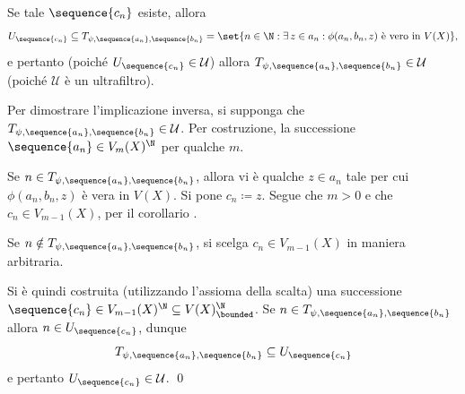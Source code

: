 {\begin{itemize}
        Se tale $ \sequence{c_{n} } $ esiste, allora \begin{equation*}
            U_{\sequence{c_{n} }} \subseteq T_{\psi, \sequence{a_{n}},\sequence{b_{n}}} = \set{n \in \N: \exists\, z \in a_{n}: \phi(a_{n}, b_{n}, z  ) \text{ è vero in }V(X)},   
        \end{equation*}e pertanto (poiché $ U_{\sequence{c_{n} }} \in \mathcal{U} $) allora $ T_{\psi, \sequence{a_{n}},\sequence{b_{n}}} \in \mathcal{U} $ (poiché $ \mathcal{U} $ è un ultrafiltro). 

        Per dimostrare l'implicazione inversa, si supponga che $ T_{\psi, \sequence{a_{n}},\sequence{b_{n}}} \in \mathcal{U} $. Per costruzione, la successione $ \sequence{a_{n} } \in V_{m}(X)^{\N}  $ per qualche $ m $. 
        
        Se $ n \in T_{\psi, \sequence{a_{n}},\sequence{b_{n}}} $, allora vi è qualche $ z \in a_{n}  $ tale per cui $ \phi(a_{n}, b_{n}, z) $ è vera in $ V(X) $. Si pone $ c_{n} \coloneqq z  $. Segue che $ m>0 $ e che $ c_{n} \in V_{m-1}(X)  $, per il corollario . 

        Se $ n \notin T_{\psi, \sequence{a_{n}},\sequence{b_{n}}}$, si scelga $ c_{n} \in V_{m-1}(X) $ in maniera arbitraria. 

        Si è quindi costruita (utilizzando l'assioma della scalta) una successione $ \sequence{c_{n} } \in V_{m-1}(X)^{\N} \subseteq V(X)^{\N}_{\bounded}  $. Se $ n \in T_{\psi, \sequence{a_{n}},\sequence{b_{n}}} $ allora $ n \in U_{\sequence{c_{n}}}  $, dunque \begin{equation*}
            T_{\psi, \sequence{a_{n}},\sequence{b_{n}}} \subseteq U_{\sequence{c_{n}} } 
        \end{equation*}e pertanto $ U_{\sequence{c_{n} }} \in \mathcal{U} $.
    \qed\end{itemize}
}
